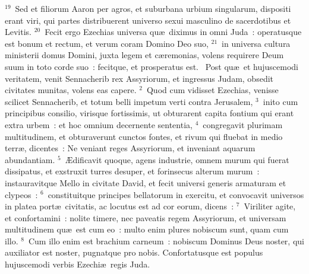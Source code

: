 ${}^{19}$~Sed et filiorum Aaron per agros, et suburbana urbium singularum, dispositi erant viri, qui partes distribuerent universo sexui masculino de sacerdotibus et Levitis.
${}^{20}$~Fecit ergo Ezechias universa qu\ae\ diximus in omni Juda~: operatusque est bonum et rectum, et verum coram Domino Deo suo,
${}^{21}$~in universa cultura ministerii domus Domini, juxta legem et c\ae remonias, volens requirere Deum suum in toto corde suo~: fecitque, et prosperatus est.
~Post qu\ae\ et hujuscemodi veritatem, venit Sennacherib rex Assyriorum, et ingressus Judam, obsedit civitates munitas, volens eas capere.
${}^{2}$~Quod cum vidisset Ezechias, venisse scilicet Sennacherib, et totum belli impetum verti contra Jerusalem,
${}^{3}$~inito cum principibus consilio, virisque fortissimis, ut obturarent capita fontium qui erant extra urbem~: et hoc omnium decernente sententia,
${}^{4}$~congregavit plurimam multitudinem, et obturaverunt cunctos fontes, et rivum qui fluebat in medio terr\ae , dicentes~: Ne veniant reges Assyriorum, et inveniant aquarum abundantiam.
${}^{5}$~\AE dificavit quoque, agens industrie, omnem murum qui fuerat dissipatus, et exstruxit turres desuper, et forinsecus alterum murum~: instauravitque Mello in civitate David, et fecit universi generis armaturam et clypeos~:
${}^{6}$~constituitque principes bellatorum in exercitu, et convocavit universos in platea port\ae\ civitatis, ac locutus est ad cor eorum, dicens~:
${}^{7}$~Viriliter agite, et confortamini~: nolite timere, nec paveatis regem Assyriorum, et universam multitudinem qu\ae\ est cum eo~: multo enim plures nobiscum sunt, quam cum illo.
${}^{8}$~Cum illo enim est brachium carneum~: nobiscum Dominus Deus noster, qui auxiliator est noster, pugnatque pro nobis. Confortatusque est populus hujuscemodi verbis Ezechi\ae\ regis Juda.


